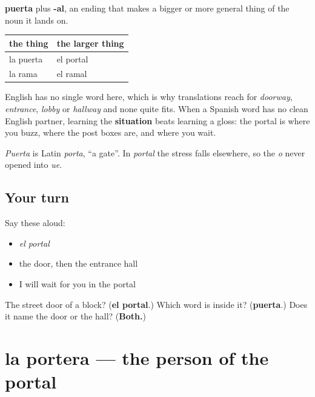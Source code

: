 \begin{cousinweb}
\textbf{puerta} plus \textbf{-al}, an ending that makes a bigger or more general thing of the noun it lands on.

\noindent
\begin{tabularx}{\linewidth}{@{}>{\raggedright\arraybackslash}X>{\raggedright\arraybackslash}X@{}}
\toprule
\textbf{the thing} & \textbf{the larger thing} \\
\midrule
la puerta & el portal \\
la rama & el ramal \\
\bottomrule
\end{tabularx}

English has no single word here, which is why translations reach for \emph{doorway}, \emph{entrance}, \emph{lobby} or \emph{hallway} and none quite fits. When a Spanish word has no clean English partner, learning the \textbf{situation} beats learning a gloss: the portal is where you buzz, where the post boxes are, and where you wait.

\emph{Puerta} is Latin \emph{porta}, \textquotedblleft{}a gate\textquotedblright{}. In \emph{portal} the stress falls elsewhere, so the \emph{o} never opened into \emph{ue}.
\end{cousinweb}

\subsection*{Your turn}
Say these aloud:

\begin{itemize}
\raggedright
  \item \emph{el portal}
  \item the door, then the entrance hall
  \item I will wait for you in the portal
\end{itemize}

\begin{tcolorbox}[breakable,colback=teal!4,colframe=teal!35!black,title={Before you move on}]
The street door of a block? (\textbf{el portal}.) Which word is inside it? (\textbf{puerta}.) Does it name the door or the hall? (\textbf{Both.})
\end{tcolorbox}
\section[la portera]{la portera — the person of the portal}

\label{lesson:ES-C433-portera}



